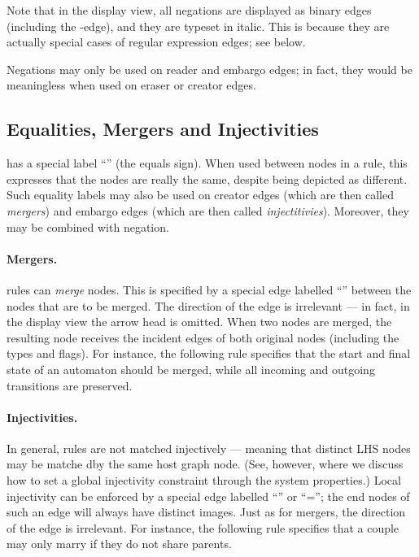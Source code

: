 Note that in the display view, all negations are displayed as binary edges
(including the -edge), and they are typeset in italic. This
is because they are actually special cases of regular expression edges; see
 below.


Negations may only be used on reader and embargo edges; in fact, they would be
meaningless when used on eraser or creator edges.

\subsection{Equalities, Mergers and Injectivities}

\Groove{} has a special label ``\lab{=}'' (the equals sign). When used
between nodes in a rule, this expresses that the nodes are really the same,
despite being depicted as different. Such equality labels may also be used on
creator edges (which are then called \emph{mergers}) and embargo edges (which
are then called \emph{injectitivies}). Moreover, they may be combined with
negation.

\paragraph{Mergers.}

\Groove{} rules can \emph{merge} nodes. This is specified by a special edge
labelled ``\newP\lab{=}'' between the nodes that are to be merged. The
direction of the edge is irrelevant --- in fact, in the display view the arrow
head is omitted. When two nodes are merged, the resulting
node receives the incident edges of both original nodes (including the
types and flags). For instance, the following rule specifies that the start
and final state of an automaton should be merged, while all incoming and
outgoing transitions are preserved.


\paragraph{Injectivities.}

In general, rules are not matched injectively --- meaning that distinct LHS
nodes may be matche dby the same host graph node. (See, however,
 where we discuss how to set a global injectivity
constraint through the system properties.) Local injectivity can be enforced by
a special edge labelled ``\lab{!=}'' or ``\notP\lab=''; the end nodes of
such an edge will always have distinct images. Just as for mergers, the
direction of the edge is irrelevant. For instance, the following rule specifies
that a couple may only marry if they do not share parents.

